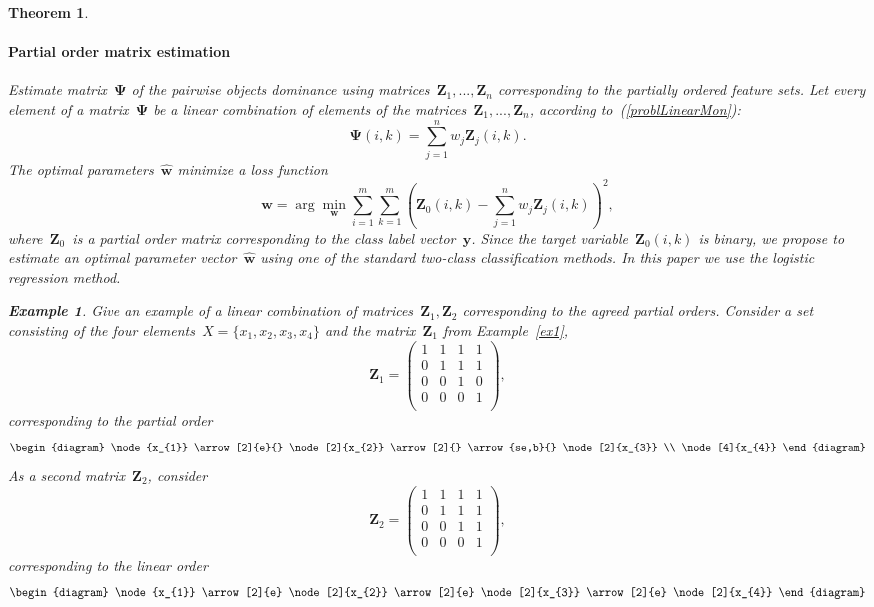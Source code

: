 \documentclass[12pt,preprint]{elsarticle}
\newcommand{\by}{\mathbf{y}}
\newcommand{\bw}{\mathbf{w}}
\newcommand{\bZ}{\mathbf{Z}}
\newcommand{\bPsi}{\boldsymbol{\Psi}}
\newtheorem{Theorem}{Theorem}
\newtheorem{Ex}{Example}
\begin{document}
\begin{Theorem}
\paragraph{Partial order matrix estimation}
Estimate matrix~$\bPsi$ of the pairwise objects dominance using matrices~$\bZ_1,...,\bZ_n$ corresponding to the partially ordered feature sets. Let every element of a matrix~$\bPsi$ be a linear combination of elements of the matrices~$\bZ_1,...,\bZ_n$, according to~(\ref{problLinearMon}):
\[
\bPsi(i,k)=\sum\limits_{j=1}^n w_j\bZ_j(i,k).
\]
The optimal parameters~$\hat{\bw}$ minimize a loss function
\[
\hat{\bw} = \arg\min\limits_{\bw}\sum\limits_{i=1}^m\sum\limits_{k=1}^m\left(\bZ_0(i,k) - \sum\limits_{j=1}^n w_j\bZ_j(i,k)\right)^2,
\]
where~$\bZ_0$~is a partial order matrix corresponding to the class label vector~$\by$.
Since the target variable~$\bZ_0(i,k)$ is binary, we propose to estimate an optimal parameter vector~$\hat{\bw}$ using one of the standard two-class classification methods. In this paper we use the logistic regression method.
\begin{Ex}
Give an example of a linear combination of matrices~$\bZ_1,\bZ_2$ corresponding to the agreed partial orders. Consider a set consisting of the four elements~$X=\{x_1,x_2,x_3,x_4\}$ and the matrix~$\bZ_1$ from Example~\ref{ex1},
\[
\bZ_1=
\begin{pmatrix}
1 & 1 & 1 & 1 \\
0 & 1 & 1 & 1 \\
0 & 0 & 1 & 0 \\
0 & 0 & 0 & 1 \\
\end{pmatrix},
\]
corresponding to the partial order
\[
\begin{diagram}
\node{x_{1}} \arrow[2]{e}{}
\node[2]{x_{2}} \arrow[2]{}
\arrow{se,b}{}
\node[2]{x_{3}} \\
\node[4]{x_{4}} %
\end{diagram}
\]
As a second matrix~$\bZ_2$, consider
\[
\bZ_2=
\begin{pmatrix}
1 & 1 & 1 & 1 \\
0 & 1 & 1 & 1 \\
0 & 0 & 1 & 1 \\
0 & 0 & 0 & 1 \\
\end{pmatrix},
\]
corresponding to the linear order
\[
\begin{diagram}
\node{x_{1}} \arrow[2]{e}
\node[2]{x_{2}} \arrow[2]{e}
\node[2]{x_{3}} \arrow[2]{e}
\node[2]{x_{4}}
\end{diagram}
\]
\end{Ex}
\end{Theorem}
\end{document}
